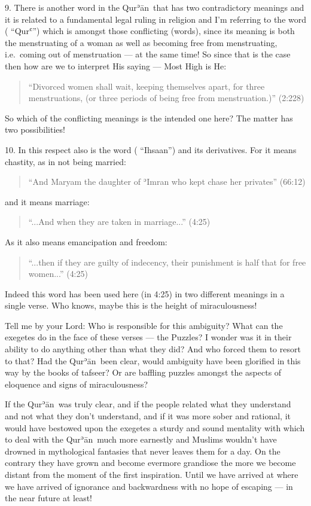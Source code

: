 \documentclass[12pt]{memoir}
\def\´{ʾ} %
\def\`{ʿ} %
\newcommand{\ar}[1]{\RL{\arabicfont#1}}
\def \Quran{Qur\-\´ān} %
\newcommand{\QRef}[1]{{\color{darkblue}#1}}
\begin{document}
9. There is another word in the \Quran\ that has two
contradictory meanings and it is related to a fundamental legal ruling
in religion and I’m referring to the word (\ar{قرء} “Qur\`”)
which is amongst those conflicting (words),
since its meaning is both the menstruating of a woman
as well as becoming free from menstruating,
i.e.\ coming out of menstruation — at the same time!
So since that is the case then how are we to interpret His saying —
Most High is He:

\begin{quote}
“Divorced women shall wait, keeping themselves apart,
for three menstruations, (or three periods of being free from menstruation.)”
(\QRef{2:228})
\end{quote}

So which of the conflicting meanings is the intended one here?
The matter has two possibilities!

10. In this respect also is the word (\ar{إحصان} “Ihsaan”)
and its derivatives.
For it means chastity, as in not being married:

\begin{quote}
“And Maryam the daughter of \´Imran who kept chase her privates”
(\QRef{66:12})
\end{quote}

and it means marriage:

\begin{quote}
“...And when they are taken in marriage...” (\QRef{4:25})
\end{quote}

As it also means emancipation and freedom:

\begin{quote}
“...then if they are guilty of indecency,
their punishment is half that for free women...” (\QRef{4:25})
\end{quote}

Indeed this word has been used here (in 4:25)
in two different meanings in a single verse.
Who knows, maybe this is the height of miraculousness!

Tell me by your Lord: Who is responsible for this ambiguity?
What can the exegetes do in the face of these verses — the Puzzles?
I wonder was it in their ability to do anything other than what they did?
And who forced them to resort to that? Had the \Quran\ been clear,
would ambiguity have been glorified in this way by the books of tafseer?
Or are baffling puzzles amongst the aspects of eloquence
and signs of miraculousness?

If the \Quran\ was truly clear, and if the people related
what they understand and not what they don’t understand,
and if it was more sober and rational,
it would have bestowed upon the exegetes a sturdy and sound mentality
with which to deal with the \Quran\ much more earnestly
and Muslims wouldn’t have drowned in mythological fantasies
that never leaves them for a day.
On the contrary they have grown and become evermore grandiose
the more we become distant from the moment of the first inspiration.
Until we have arrived at where we have arrived of ignorance and backwardness
with no hope of escaping — in the near future at least!
\end{document}
